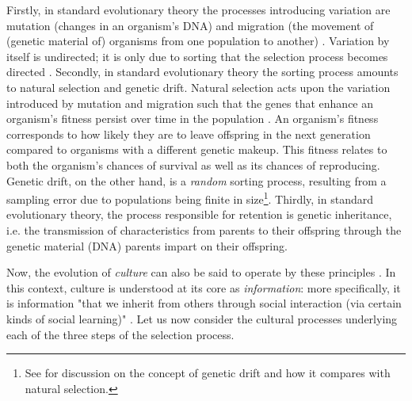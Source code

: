 Firstly, in standard evolutionary theory the processes introducing variation are mutation (changes in an organism's DNA) and migration (the movement of (genetic material of) organisms from one population to another) \citep{S-P13}.
Variation by itself is undirected; it is only due to sorting that the selection process becomes directed \citep{Donahoe03}.
Secondly, in standard evolutionary theory the sorting process amounts to natural selection and genetic drift. Natural selection acts upon the variation introduced by mutation and migration such that the genes that enhance an organism's fitness persist over time in the population \citep{S-P13}. An organism's fitness corresponds to how likely they are to leave offspring in the next generation compared to organisms with a different genetic makeup. This fitness relates to both the organism's chances of survival as well as its chances of reproducing. 
Genetic drift, on the other hand, is a \emph{random} sorting process, resulting from a sampling error due to populations being finite in size\footnote{See \citet{Millstein21} for discussion on the concept of genetic drift and how it compares with natural selection.}.
Thirdly, in standard evolutionary theory, the process responsible for retention is genetic inheritance, i.e. the transmission of characteristics from parents to their offspring through the genetic material (DNA) parents impart on their offspring.

Now, the evolution of \emph{culture} can also be said to operate by these principles \citep{Heyes18}. In this context, culture is understood at its core as \emph{information}: more specifically, it is information "that we inherit from others through social interaction (via certain kinds of social learning)" \citep[p.~30]{Heyes18}.
Let us now consider the cultural processes underlying each of the three steps of the selection process.

